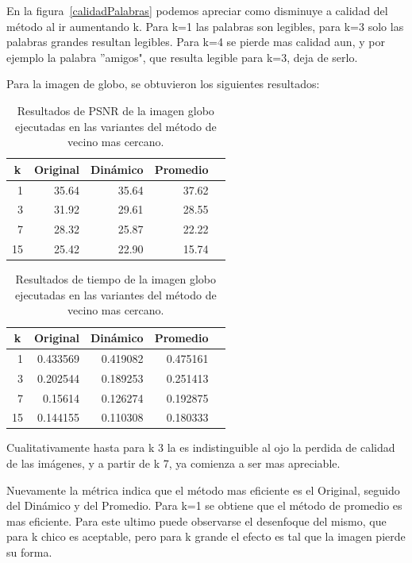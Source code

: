 \documentclass[a4paper]{article}
\newcounter{col}
\begin{document}
En la figura~\ref{calidadPalabras} podemos apreciar como disminuye a calidad del método al ir aumentando k. Para k=1 las palabras son legibles, para k=3 solo las palabras grandes resultan legibles. Para k=4 se pierde mas calidad aun, y por ejemplo la palabra ''amigos", que resulta legible para k=3, deja de serlo.


Para la imagen de globo, se obtuvieron los siguientes resultados:


\begin{table}[H]
\centering
\begin{tabular}{|r|r|r|r|r|}
\hline
\multicolumn{1}{|c|}{k} & \multicolumn{1}{c|}{Original} & \multicolumn{1}{c|}{Dinámico} & \multicolumn{1}{c|}{Promedio} \\ \hline
1 & 35.64 & 35.64& 37.62 \\ \hline
3 & 31.92 &  29.61 & 28.55 \\ \hline
7 & 28.32 &  25.87 & 22.22 \\ \hline
15 &25.42&  22.90 & 15.74 \\ \hline
\end{tabular}
\caption{Resultados de PSNR de la imagen globo ejecutadas en las variantes del m\'etodo de vecino mas cercano.}
\label{}
\end{table}

\begin{table}[H]
\centering
\begin{tabular}{|r|r|r|r|r|}
\hline
\multicolumn{1}{|c|}{k} & \multicolumn{1}{c|}{Original} & \multicolumn{1}{c|}{Dinámico} & \multicolumn{1}{c|}{Promedio} \\ \hline
1 & 0.433569 & 0.419082& 0.475161 \\ \hline
3 & 0.202544 &  0.189253 & 0.251413 \\ \hline
7 &  0.15614 &  0.126274 & 0.192875 \\ \hline
15 &0.144155&  0.110308 & 0.180333 \\ \hline
\end{tabular}
\caption{Resultados de tiempo de la imagen globo ejecutadas en las variantes del m\'etodo de vecino mas cercano.}
\label{}
\end{table}



Cualitativamente hasta para k 3 la es indistinguible al ojo la perdida de calidad de las imágenes, y a partir de k 7, ya comienza a ser mas apreciable.

Nuevamente la métrica indica que el método mas eficiente es el Original, seguido del Dinámico y del Promedio. Para k=1 se obtiene que el método de promedio es mas eficiente. Para este ultimo puede observarse el desenfoque del mismo, que para k chico es aceptable, pero para k grande el efecto es tal que la imagen pierde su forma.
\end{document}
